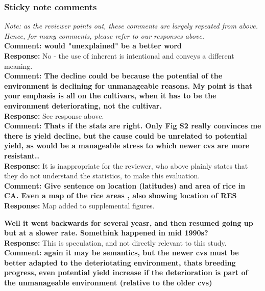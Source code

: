\documentclass{article} \usepackage[margin=1in]{geometry}
\begin{document}
\subsubsection{Sticky note comments}

\textit{Note: as the reviewer points out, these comments are largely
  repeated from above. Hence, for many comments, please refer to our
  responses above.}\\

\textbf{Comment: would "unexplained" be a better word}\\

\textbf{Response:} No - the use of inherent is intentional and conveys
a different meaning.\\

\textbf{Comment: The decline could be because the potential of the
  environment is declining for unmanageable reasons. My point is that
  your emphasis is all on the cultivars, when it has to be the
  environment deteriorating, not the cultivar. }\\

\textbf{Response: } See response above.\\

\textbf{Comment: Thats if the stats are right. Only Fig S2 really
  convinces me there is yield decline, but the cause could be
  unrelated to potential yield, as would be a manageable stress to
  which newer cvs are more resistant..}\\

\textbf{Response: } It is inappropriate for the reviewer, who above plainly
states that they do not understand the statistics, to make this
evaluation.\\

\textbf{Comment: Give sentence on location (latitudes) and area of rice in
  CA. Even a map of the rice areas , also showing location of RES}\\

\textbf{Response: } Map added to supplemental figures.

\textbf{Well it went backwards for several yeasr, and then resumed
  going up but at a slower rate. Somethink happened in mid 1990s?}\\

\textbf{Response: } This is speculation, and not directly relevant to
this study.\\

\textbf{Comment: again it may be semantics, but the newer cvs must be
  better adapted to the deteriotating environment, thats breeding
  progress, even potential yield increase if the deterioration is part
  of the unmanageable environment (relative to the older cvs)}\\
\end{document}
